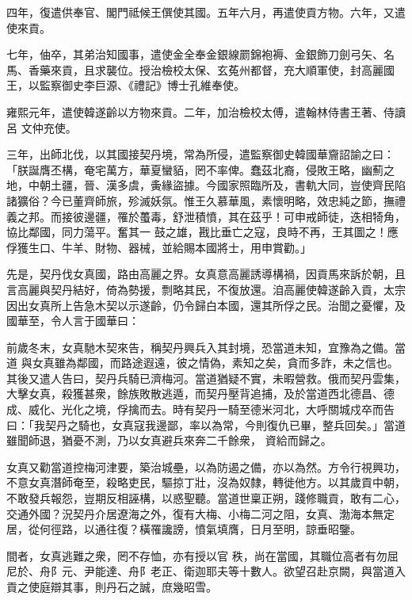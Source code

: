 \begin{pinyinscope}
 四年，復遣供奉官、閣門祗候王僎使其國。五年六月，再遣使貢方物。六年，又遣使來貢。



 七年，伷卒，其弟治知國事，遣使金全奉金銀線罽錦袍褥、金銀飾刀劍弓矢、名馬、香藥來貢，且求襲位。授治檢校太保、玄菟州都督，充大順軍使，封高麗國王，以監察御史李巨源、《禮記》博士孔維奉使。



 雍熙元年，遣使韓遂齡以方物來貢。二年，加治檢校太傅，遣翰林侍書王著、侍讀呂
 文仲充使。



 三年，出師北伐，以其國接契丹境，常為所侵，遣監察御史韓國華齎詔諭之曰：「朕誕膺丕構，奄宅萬方，華夏蠻貊，罔不率俾。蠢茲北裔，侵敗王略，幽薊之地，中朝土疆，晉、漢多虞，夤緣盜據。今國家照臨所及，書軌大同，豈使齊民陷諸獷俗？今已董齊師旅，殄滅妖氛。惟王久慕華風，素懷明略，效忠純之節，撫禮義之邦。而接彼邊疆，罹於蠆毒，舒泄積憤，其在茲乎！可申戒師徒，迭相犄角，協比鄰國，同力蕩平。奮其一
 鼓之雄，戡比垂亡之寇，良時不再，王其圖之！應俘獲生口、牛羊、財物、器械，並給賜本國將士，用申賞勸。」



 先是，契丹伐女真國，路由高麗之界。女真意高麗誘導構禍，因貢馬來訴於朝，且言高麗與契丹結好，倚為勢援，剽略其民，不復放還。洎高麗使韓遂齡入貢，太宗因出女真所上告急木契以示遂齡，仍令歸白本國，還其所俘之民。治聞之憂懼，及國華至，令人言于國華曰：



 前歲冬末，女真馳木契來告，稱契丹興兵入其封境，恐當道未知，宜豫為之備。當道
 與女真雖為鄰國，而路途遐遠，彼之情偽，素知之矣，貪而多詐，未之信也。其後又遣人告曰，契丹兵騎已濟梅河。當道猶疑不實，未暇營救。俄而契丹雲集，大擊女真，殺獲甚衆，餘族敗散逃遁，而契丹壓背追捕，及於當道西北德昌、德成、威化、光化之境，俘擒而去。時有契丹一騎至德米河北，大呼關城戍卒而告曰：「我契丹之騎也，女真寇我邊鄙，率以為常，今則復仇已畢，整兵回矣。」當道雖聞師退，猶憂不測，乃以女真避兵來奔二千餘衆，
 資給而歸之。



 女真又勸當道控梅河津要，築治城壘，以為防遏之備，亦以為然。方令行視興功，不意女真潛師奄至，殺略吏民，驅掠丁壯，沒為奴隸，轉徙他方。以其歲貢中朝，不敢發兵報怨，豈期反相誣構，以惑聖聽。當道世稟正朔，踐修職貢，敢有二心，交通外國？況契丹介居遼海之外，復有大梅、小梅二河之阻，女真、渤海本無定居，從何徑路，以通往復？橫罹讒謗，憤氣填膺，日月至明，諒垂昭鑒。



 間者，女真逃難之衆，罔不存恤，亦有授以官
 秩，尚在當國，其職位高者有勿屈尼於、舟阝元、尹能達、舟阝老正、衛迦耶夫等十數人。欲望召赴京闕，與當道入貢之使庭辯其事，則丹石之誠，庶幾昭雪。




\end{pinyinscope}
